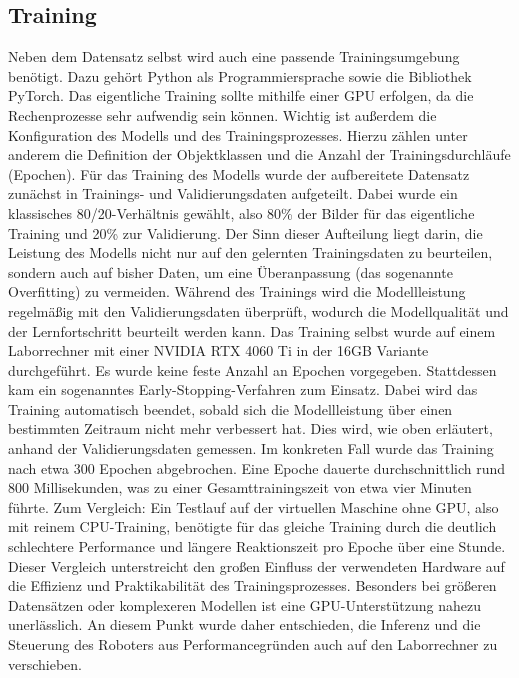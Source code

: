 \subsection{Training}
Neben dem Datensatz selbst wird auch eine passende Trainingsumgebung benötigt. Dazu gehört Python als Programmiersprache sowie die Bibliothek PyTorch. 
Das eigentliche Training sollte mithilfe einer GPU erfolgen, da die Rechenprozesse sehr aufwendig sein können. Wichtig ist außerdem die Konfiguration des Modells und des Trainingsprozesses. 
Hierzu zählen unter anderem die Definition der Objektklassen und die Anzahl der Trainingsdurchläufe (Epochen).
\newPar
Für das Training des Modells wurde der aufbereitete Datensatz zunächst in Trainings\hyp{} und Validierungsdaten aufgeteilt. 
Dabei wurde ein klassisches 80/20\hyp{}Verhältnis gewählt, also 80\% der Bilder für das eigentliche Training und 20\% zur Validierung. 
Der Sinn dieser Aufteilung liegt darin, die Leistung des Modells nicht nur auf den gelernten Trainingsdaten zu beurteilen, sondern auch auf bisher  Daten, 
um eine Überanpassung (das sogenannte Overfitting) zu vermeiden. 
Während des Trainings wird die Modellleistung regelmäßig mit den Validierungsdaten überprüft, wodurch die Modellqualität und der Lernfortschritt beurteilt werden kann.
\newPar
Das Training selbst wurde auf einem Laborrechner mit einer NVIDIA RTX 4060 Ti in der 16GB Variante durchgeführt. Es wurde keine feste Anzahl an Epochen vorgegeben. 
Stattdessen kam ein sogenanntes Early-Stopping-Verfahren zum Einsatz. Dabei wird das Training automatisch beendet, 
sobald sich die Modellleistung über einen bestimmten Zeitraum nicht mehr verbessert hat.
Dies wird, wie oben erläutert, anhand der Validierungsdaten gemessen. Im konkreten Fall wurde das Training nach etwa 300 Epochen abgebrochen. 
Eine Epoche dauerte durchschnittlich rund 800 Millisekunden, was zu einer Gesamttrainingszeit von etwa vier Minuten führte.
\newPar
Zum Vergleich: Ein Testlauf auf der virtuellen Maschine ohne GPU, also mit reinem CPU-Training, benötigte für das gleiche Training durch die deutlich schlechtere Performance und 
längere Reaktionszeit pro Epoche über eine Stunde. Dieser Vergleich unterstreicht den großen Einfluss der verwendeten Hardware auf die Effizienz und Praktikabilität des Trainingsprozesses. 
Besonders bei größeren Datensätzen oder komplexeren Modellen ist eine GPU-Unterstützung nahezu unerlässlich.
\newPar
An diesem Punkt wurde daher entschieden, die Inferenz und die Steuerung des Roboters aus Performancegründen auch auf den Laborrechner zu verschieben.
